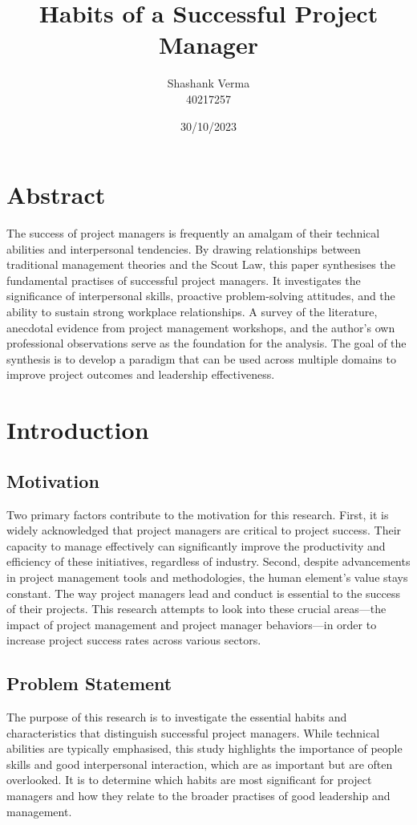 \documentclass{article}
\title{Habits of a Successful Project Manager}
\author{Shashank Verma \\ 40217257}
\date{30/10/2023}
\begin{document}
\maketitle
{}

\newpage
\tableofcontents
\newpage
{}

\section{Abstract}
The success of project managers is frequently an amalgam of their technical abilities and interpersonal tendencies. By drawing relationships between traditional management theories and the Scout Law, this paper synthesises the fundamental practises of successful project managers. It investigates the significance of interpersonal skills, proactive problem-solving attitudes, and the ability to sustain strong workplace relationships. A survey of the literature, anecdotal evidence from project management workshops, and the author's own professional observations serve as the foundation for the analysis. The goal of the synthesis is to develop a paradigm that can be used across multiple domains to improve project outcomes and leadership effectiveness.

\section{Introduction}
\subsection{Motivation}
Two primary factors contribute to the motivation for this research. First, it is widely acknowledged that project managers are critical to project success. Their capacity to manage effectively can significantly improve the productivity and efficiency of these initiatives, regardless of industry. Second, despite advancements in project management tools and methodologies, the human element's value stays constant. The way project managers lead and conduct is essential to the success of their projects. This research attempts to look into these crucial areas—the impact of project management and project manager behaviors—in order to increase project success rates across various sectors.


\subsection{Problem Statement}
The purpose of this research is to investigate the essential habits and characteristics that distinguish successful project managers. While technical abilities are typically emphasised, this study highlights the importance of people skills and good interpersonal interaction, which are as important but are often overlooked. It is to determine which habits are most significant for project managers and how they relate to the broader practises of good leadership and management.
\end{document}
